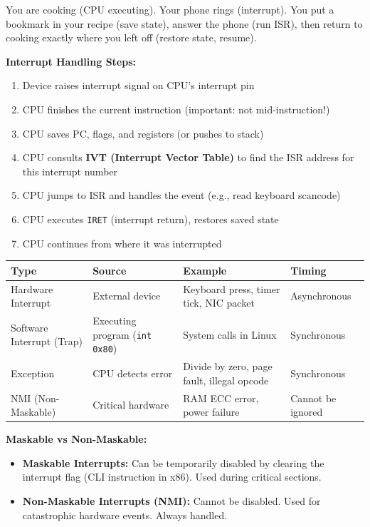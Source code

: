 \documentclass[11pt,a4paper]{article}
\newcommand{\code}[1]{\texttt{\small\colorbox{codebg}{\color{codekw}#1}}}
\newcommand{\term}[1]{\textbf{\color{darkblue}#1}}
\begin{document}
\begin{analogy}
You are cooking (CPU executing). Your phone rings (interrupt). You put a bookmark in your recipe (save state), answer the phone (run ISR), then return to cooking exactly where you left off (restore state, resume).
\end{analogy}

\textbf{Interrupt Handling Steps:}
\begin{enumerate}[noitemsep]
  \item Device raises interrupt signal on CPU's interrupt pin
  \item CPU finishes the current instruction (important: not mid-instruction!)
  \item CPU saves PC, flags, and registers (or pushes to stack)
  \item CPU consults \term{IVT (Interrupt Vector Table)} to find the ISR address for this interrupt number
  \item CPU jumps to ISR and handles the event (e.g., read keyboard scancode)
  \item CPU executes \code{IRET} (interrupt return), restores saved state
  \item CPU continues from where it was interrupted
\end{enumerate}

\begin{center}
\begin{tabular}{L{3.5cm} L{4cm} L{4cm} L{2.5cm}}
\toprule
\textbf{Type} & \textbf{Source} & \textbf{Example} & \textbf{Timing} \\
\midrule
Hardware Interrupt & External device & Keyboard press, timer tick, NIC packet & Asynchronous \\[4pt]
Software Interrupt (Trap) & Executing program (\code{int 0x80}) & System calls in Linux & Synchronous \\[4pt]
Exception & CPU detects error & Divide by zero, page fault, illegal opcode & Synchronous \\[4pt]
NMI (Non-Maskable) & Critical hardware & RAM ECC error, power failure & Cannot be ignored \\
\bottomrule
\end{tabular}
\end{center}

\textbf{Maskable vs Non-Maskable:}
\begin{itemize}[noitemsep]
  \item \term{Maskable Interrupts:} Can be temporarily disabled by clearing the interrupt flag (CLI instruction in x86). Used during critical sections.
  \item \term{Non-Maskable Interrupts (NMI):} Cannot be disabled. Used for catastrophic hardware events. Always handled.
\end{itemize}
\end{document}

